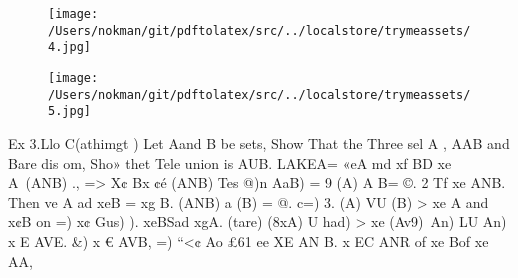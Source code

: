 \documentclass[a4paper,12pt]{article}
\begin{document}
\vspace{10pt}

\par

\vspace{10pt}

\begin{figure}[h]

\texttt{[image: /Users/nokman/git/pdftolatex/src/../localstore/trymeassets/4.jpg]}

\centering

\end{figure}

\par

\vspace{10pt}

\begin{figure}[h]

\texttt{[image: /Users/nokman/git/pdftolatex/src/../localstore/trymeassets/5.jpg]}

\centering

\end{figure}

\par

\vspace{10pt}

    Ex 3.Llo C(athimgt )  Let Aand B be sets,    Show That the Three sel A \B, AAB and B\A are dis om,  Sho» thet Tele union is AUB.    LAKEA\B = «eA md xf BD xe A\ (ANB) .,  => X¢ B\A x ¢é (ANB)    Tes @\8)n AaB) = 9  (A) A B\A = ©.    2 Tf xe ANB. Then ve A ad xeB = xg B\A.  (ANB) a (B\A) = @.    c=)  3. (A\B) VU (B\A) > xe A and x¢B    on =) x¢ Gus) \Aas).  xeBSad xgA.  (tare) (8xA) U had) > xe (Av9)\ An) LU An)  x E AVE.    \&) x € AVB, =) “<¢ Ao £61 ee XE AN B.  x EC ANR of xe B\A of xe AA, 

\vspace{10pt}

\par

\vspace{10pt}
\end{document}
